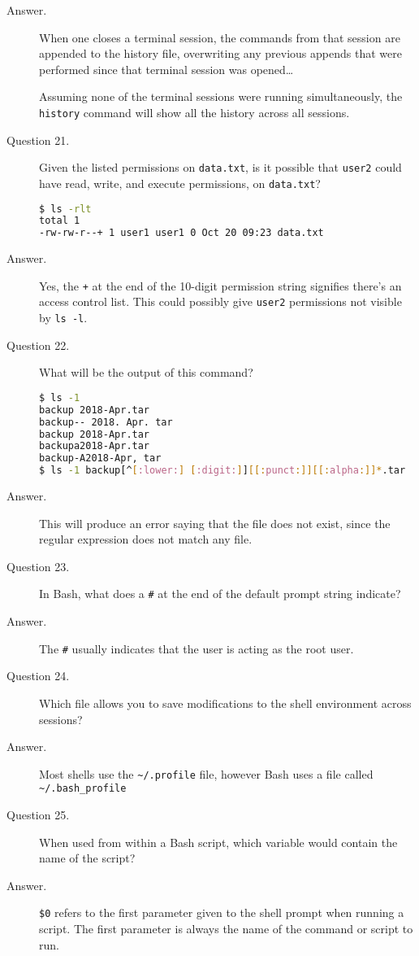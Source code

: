 \documentclass{article}
\begin{document}
\begin{description}
	\item[Answer.]
		When one closes a terminal session, the commands from that session are appended to the history file, overwriting any previous appends that were performed since that terminal session was opened\dots

		Assuming none of the terminal sessions were running simultaneously, the \verb`history` command will show all the history across all sessions.

	\item[Question 21.]
		Given the listed permissions on \verb`data.txt`, is it possible that \verb`user2` could have read, write, and execute permissions, on \verb`data.txt`?

		\begin{lstlisting}[language=bash]
$ ls -rlt
total 1
-rw-rw-r--+ 1 user1 user1 0 Oct 20 09:23 data.txt
		\end{lstlisting}

	\item[Answer.]
		Yes, the \verb`+` at the end of the 10-digit permission string signifies there's an access control list. This could possibly give \verb`user2` permissions not visible by \verb`ls -l`.

	\item[Question 22.]
		What will be the output of this command?

		\begin{lstlisting}[language=bash]
$ ls -1
backup 2018-Apr.tar
backup-- 2018. Apr. tar
backup 2018-Apr.tar
backupa2018-Apr.tar
backup-A2018-Apr, tar
$ ls -1 backup[^[:lower:] [:digit:]][[:punct:]][[:alpha:]]*.tar
		\end{lstlisting}

	\item[Answer.]
		This will produce an error saying that the file does not exist, since the regular expression does not match any file.

	\item[Question 23.]
		In Bash, what does a \verb`#` at the end of the default prompt string indicate?

	\item[Answer.]
		The \verb`#` usually indicates that the user is acting as the root user.

	\item[Question 24.]
		Which file allows you to save modifications to the shell environment across sessions?

	\item[Answer.]
		Most shells use the \verb`~/.profile` file, however Bash uses a file called \verb`~/.bash_profile`

	\item[Question 25.]
		When used from within a Bash script, which variable would contain the name of the script?

	\item[Answer.]
		\verb`$0` refers to the first parameter given to the shell prompt when running a script. The first parameter is always the name of the command or script to run.

\end{description}
\end{document}
